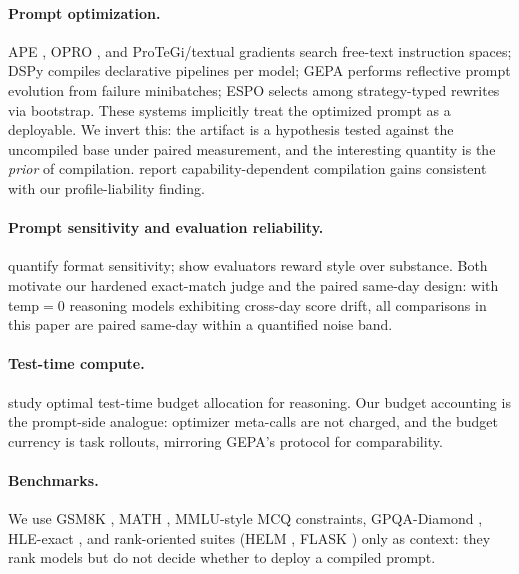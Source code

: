 \documentclass[11pt]{article}
\begin{document}
\paragraph{Prompt optimization.} APE \citep{zhou2023large}, OPRO \citep{yang2024large}, and ProTeGi/textual gradients \citep{prasad2023grips} search free-text instruction spaces; DSPy \citep{khattab2024dspy} compiles declarative pipelines per model; GEPA \citep{agrawal2025gepa} performs reflective prompt evolution from failure minibatches; ESPO \citep{espo2026} selects among strategy-typed rewrites via bootstrap. These systems implicitly treat the optimized prompt as a deployable. We invert this: the artifact is a hypothesis tested against the uncompiled base under paired measurement, and the interesting quantity is the \emph{prior} of compilation. \citet{zhang2026capability} report capability-dependent compilation gains consistent with our profile-liability finding.

\paragraph{Prompt sensitivity and evaluation reliability.} \citet{sclar2024quantifying} quantify format sensitivity; \citet{wu2024style} show evaluators reward style over substance. Both motivate our hardened exact-match judge and the paired same-day design: with temp$=0$ reasoning models exhibiting cross-day score drift, all comparisons in this paper are paired same-day within a quantified noise band.

\paragraph{Test-time compute.} \citet{snell2024scaling} study optimal test-time budget allocation for reasoning. Our budget accounting is the prompt-side analogue: optimizer meta-calls are not charged, and the budget currency is task rollouts, mirroring GEPA's protocol for comparability.

\paragraph{Benchmarks.} We use GSM8K \citep{cobbe2021training}, MATH \citep{hendrycks2021measuring_math}, MMLU-style MCQ constraints, GPQA-Diamond \citep{rein2024gpqa}, HLE-exact \citep{phan2025humanity}, and rank-oriented suites (HELM \citep{liang2023holistic}, FLASK \citep{chen2023flask}) only as context: they rank models but do not decide whether to deploy a compiled prompt.
\end{document}

